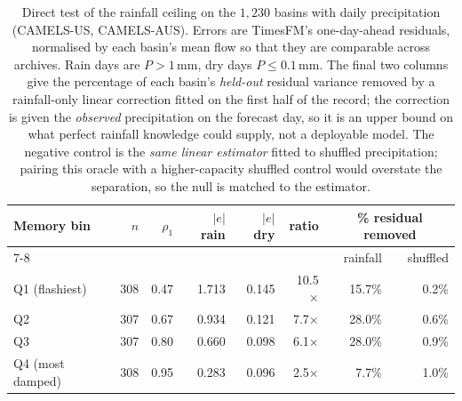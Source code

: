 \begin{table}[t]
\centering
\caption{Direct test of the rainfall ceiling on the $1{,}230$ basins with daily precipitation (CAMELS-US, CAMELS-AUS). Errors are TimesFM's one-day-ahead residuals, normalised by each basin's mean flow so that they are comparable across archives. Rain days are $P>1$\,mm, dry days $P\leq0.1$\,mm. The final two columns give the percentage of each basin's \emph{held-out} residual variance removed by a rainfall-only linear correction fitted on the first half of the record; the correction is given the \emph{observed} precipitation on the forecast day, so it is an upper bound on what perfect rainfall knowledge could supply, not a deployable model. The negative control is the \emph{same linear estimator} fitted to shuffled precipitation; pairing this oracle with a higher-capacity shuffled control would overstate the separation, so the null is matched to the estimator.}
\label{tab:rainfall_ceiling}
\begin{tabular}{lrrrrrrr}
\hline
Memory bin & $n$ & $\rho_1$ & $|e|$ rain & $|e|$ dry & ratio & \multicolumn{2}{c}{\% residual removed} \\
\cline{7-8}
 & & & & & & rainfall & shuffled \\
\hline
Q1 (flashiest) & 308 & 0.47 & 1.713 & 0.145 & 10.5$\times$ & 15.7\% & 0.2\% \\
Q2 & 307 & 0.67 & 0.934 & 0.121 & 7.7$\times$ & 28.0\% & 0.6\% \\
Q3 & 307 & 0.80 & 0.660 & 0.098 & 6.1$\times$ & 28.0\% & 0.9\% \\
Q4 (most damped) & 308 & 0.95 & 0.283 & 0.096 & 2.5$\times$ & 7.7\% & 1.0\% \\
\hline
\end{tabular}
\end{table}